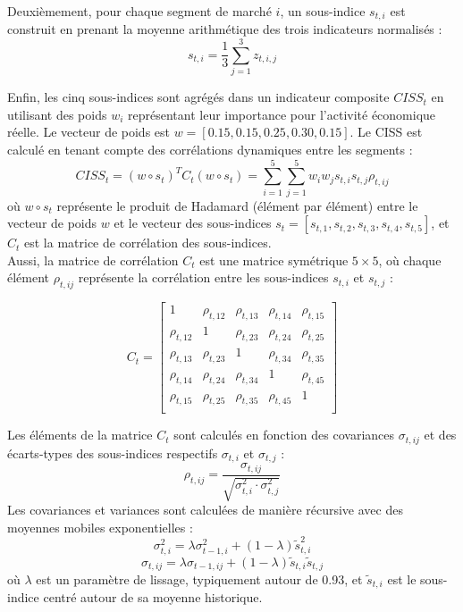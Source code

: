 \begin{sloppypar}
Deuxièmement, pour chaque segment de marché \( i \), un sous-indice \( s_{t,i} \) est construit en prenant la moyenne arithmétique des trois indicateurs normalisés :
\[
s_{t,i} = \frac{1}{3} \sum_{j=1}^{3} z_{t,i,j}
\]

Enfin, les cinq sous-indices sont agrégés dans un indicateur composite \( CISS_t \) en utilisant des poids \( w_i \) représentant leur importance pour l'activité économique réelle. Le vecteur de poids est \( w = [0.15, 0.15, 0.25, 0.30, 0.15] \). Le CISS est calculé en tenant compte des corrélations dynamiques entre les segments :
\[
CISS_t = \left( w \circ s_t \right)^T C_t \left( w \circ s_t \right) = \sum_{i=1}^{5} \sum_{j=1}^{5} w_i w_j s_{t,i} s_{t,j} \rho_{t,ij}
\]
où \( w \circ s_t \) représente le produit de Hadamard (élément par élément) entre le vecteur de poids \( w \) et le vecteur des sous-indices \( s_t = [s_{t,1}, s_{t,2}, s_{t,3}, s_{t,4}, s_{t,5}] \), et \( C_t \) est la matrice de corrélation des sous-indices.\\

Aussi, la matrice de corrélation \( C_t \) est une matrice symétrique \( 5 \times 5 \), où chaque élément \( \rho_{t,ij} \) représente la corrélation entre les sous-indices \( s_{t,i} \) et \( s_{t,j} \) :

\begin{equation}
C_t = \begin{bmatrix}
1 & \rho_{t,12} & \rho_{t,13} & \rho_{t,14} & \rho_{t,15} \\
\rho_{t,12} & 1 & \rho_{t,23} & \rho_{t,24} & \rho_{t,25} \\
\rho_{t,13} & \rho_{t,23} & 1 & \rho_{t,34} & \rho_{t,35} \\
\rho_{t,14} & \rho_{t,24} & \rho_{t,34} & 1 & \rho_{t,45} \\
\rho_{t,15} & \rho_{t,25} & \rho_{t,35} & \rho_{t,45} & 1 \\
\end{bmatrix}
\end{equation}


Les éléments de la matrice \( C_t \) sont calculés en fonction des covariances \( \sigma_{t,ij} \) et des écarts-types des sous-indices respectifs \( \sigma_{t,i} \) et \( \sigma_{t,j} \) :
\[
\rho_{t,ij} = \frac{\sigma_{t,ij}}{\sqrt{\sigma_{t,i}^2 \cdot \sigma_{t,j}^2}}
\]
Les covariances et variances sont calculées de manière récursive avec des moyennes mobiles exponentielles :
\[
\sigma_{t,i}^2 = \lambda \sigma_{t-1,i}^2 + (1 - \lambda) \tilde{s}_{t,i}^2
\]
\[
\sigma_{t,ij} = \lambda \sigma_{t-1,ij} + (1 - \lambda) \tilde{s}_{t,i} \tilde{s}_{t,j}
\]
où \( \lambda \) est un paramètre de lissage, typiquement autour de 0.93, et \( \tilde{s}_{t,i} \) est le sous-indice centré autour de sa moyenne historique.\\











\end{sloppypar}
